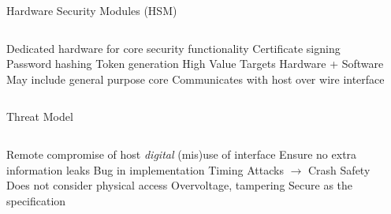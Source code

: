 \begin{frame}{Hardware Security Modules (HSM)}
\begin{columns}
  \centering
  \begin{outline}
  \1 Dedicated hardware for core security functionality
  \2 Certificate signing
  \2 Password hashing
  \2 Token generation
  \1 High Value Targets
  \1 Hardware + Software
  \2 May include general purpose core
  \2 Communicates with host over wire interface
  \end{outline}

  \centering
  \begin{center}


  \end{center}
\end{columns}
\end{frame}

\begin{frame}{Threat Model}
\begin{columns}
  \centering
  \begin{outline}
  \1 Remote compromise of host 
  \1 \textit{digital} (mis)use of interface
  \1 Ensure no extra information leaks
  \2 Bug in implementation
  \2 Timing Attacks $\rightarrow$ 
  \2 Crash Safety
  \1 Does not consider physical access
  \2 Overvoltage, tampering
  \2 Secure as the specification
  \end{outline}

  \centering
  \begin{center}

  \end{center}
\end{columns}
\end{frame}

